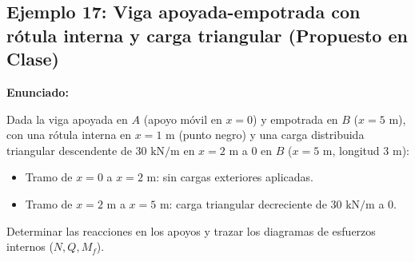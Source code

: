 \subsection{Ejemplo 17: Viga apoyada-empotrada con rótula interna y carga triangular (Propuesto en Clase)}



\textbf{Enunciado:}

Dada la viga apoyada en $A$ (apoyo móvil en $x = 0$) y empotrada en $B$ ($x = 5\text{ m}$), con una rótula interna en $x = 1\text{ m}$ (punto negro) y una carga distribuida triangular descendente de $30\text{ kN/m}$ en $x = 2\text{ m}$ a $0$ en $B$ ($x = 5\text{ m}$, longitud $3\text{ m}$):

\begin{itemize}

    \item Tramo de $x=0$ a $x=2\text{ m}$: sin cargas exteriores aplicadas.

    \item Tramo de $x=2\text{ m}$ a $x=5\text{ m}$: carga triangular decreciente de $30\text{ kN/m}$ a $0$.

\end{itemize}



Determinar las reacciones en los apoyos y trazar los diagramas de esfuerzos internos ($N, Q, M_f$).



